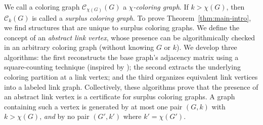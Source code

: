 \documentclass{amsart}
\theoremstyle{hypothesisstyle}
\theoremstyle{definition}
\theoremstyle{remark}
\numberwithin{equation}{section}
\begin{document}
\begin{center}
\end{center}

We call a coloring graph $\mathcal{C}_{\chi(G)}(G)$ a \emph{$\chi$-coloring graph}. If $k>\chi(G)$, then $\mathcal{C}_k(G)$ is called a \emph{surplus coloring graph}. To prove Theorem~\ref{thm:main-intro}, we find structures that are unique to surplus coloring graphs. We define the concept of an \emph{abstract link vertex}, whose presence can be algorithmically checked in an arbitrary coloring graph (without knowing $G$ or $k$). We develop three algorithms: the first reconstructs the base graph’s adjacency matrix using a square-counting technique (inspired by \cite{HSTT24}); the second extracts the underlying coloring partition at a link vertex; and the third organizes equivalent link vertices into a labeled link graph. Collectively, these algorithms prove that the presence of an abstract link vertex is a certificate for surplus coloring graphs. A graph containing such a vertex is generated by at most one pair $(G,k)$ with $k>\chi(G)$, \emph{and} by no pair $(G',k')$ where $k' = \chi(G')$. 
\end{document}
